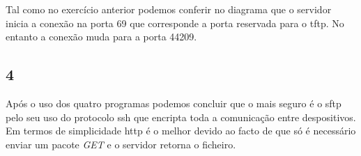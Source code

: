 \documentclass{article}
\begin{document}
            Tal como no exercício anterior podemos conferir no diagrama que o servidor inicia a conexão na porta 69 que corresponde a porta reservada para o tftp. No entanto a conexão muda para a porta 44209.
        \subsection*{4}
                Após o uso dos quatro programas podemos concluir que o mais seguro é o sftp pelo seu uso do protocolo ssh que encripta toda a comunicação entre despositivos.
            Em termos de simplicidade http é o melhor devido ao facto de que só é necessário enviar um pacote \textit{GET} e o servidor retorna o ficheiro.
\end{document}

